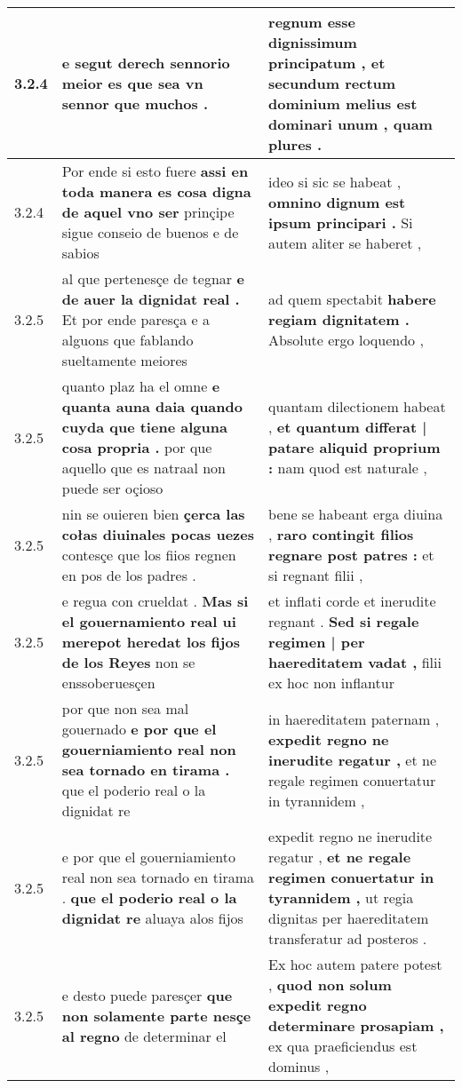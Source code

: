 \begin{tabular}{|p{1cm}|p{6.5cm}|p{6.5cm}|}
3.2.4 & e segut derech \textbf{ sennorio meior es } que sea vn sennor que muchos . & regnum esse dignissimum principatum , \textbf{ et secundum rectum dominium melius est dominari unum , } quam plures . \\\hline
3.2.4 & Por ende si esto fuere \textbf{ assi en toda manera es cosa digna de aquel vno ser } prinçipe sigue conseio de buenos e de sabios & ideo si sic se habeat , \textbf{ omnino dignum est ipsum principari . } Si autem aliter se haberet , \\\hline
3.2.5 & al que pertenesçe de tegnar \textbf{ e de auer la dignidat real . } Et por ende paresça e a alguons que fablando sueltamente meiores & ad quem spectabit \textbf{ habere regiam dignitatem . } Absolute ergo loquendo , \\\hline
3.2.5 & quanto plaz ha el omne \textbf{ e quanta auna daia quando cuyda que tiene alguna cosa propria . } por que aquello que es natraal non puede ser oçioso & quantam dilectionem habeat , \textbf{ et quantum differat | patare aliquid proprium : } nam quod est naturale , \\\hline
3.2.5 & nin se ouieren bien \textbf{ çerca las cołas diuinales pocas uezes } contesçe que los fiios regnen en pos de los padres . & bene se habeant erga diuina , \textbf{ raro contingit filios regnare post patres : } et si regnant filii , \\\hline
3.2.5 & e regua con crueldat . \textbf{ Mas si el gouernamiento real ui merepot heredat los fijos de los Reyes } non se enssoberuesçen & et inflati corde et inerudite regnant . \textbf{ Sed si regale regimen | per haereditatem vadat , } filii ex hoc non inflantur \\\hline
3.2.5 & por que non sea mal gouernado \textbf{ e por que el gouerniamiento real non sea tornado en tirama . } que el poderio real o la dignidat re & in haereditatem paternam , \textbf{ expedit regno ne inerudite regatur , } et ne regale regimen conuertatur in tyrannidem , \\\hline
3.2.5 & e por que el gouerniamiento real non sea tornado en tirama . \textbf{ que el poderio real o la dignidat re } aluaya alos fijos & expedit regno ne inerudite regatur , \textbf{ et ne regale regimen conuertatur in tyrannidem , } ut regia dignitas per haereditatem transferatur ad posteros . \\\hline
3.2.5 & e desto puede paresçer \textbf{ que non solamente parte nesçe al regno } de determinar el & Ex hoc autem patere potest , \textbf{ quod non solum expedit regno determinare prosapiam , } ex qua praeficiendus est dominus , \\\hline

\end{tabular}
